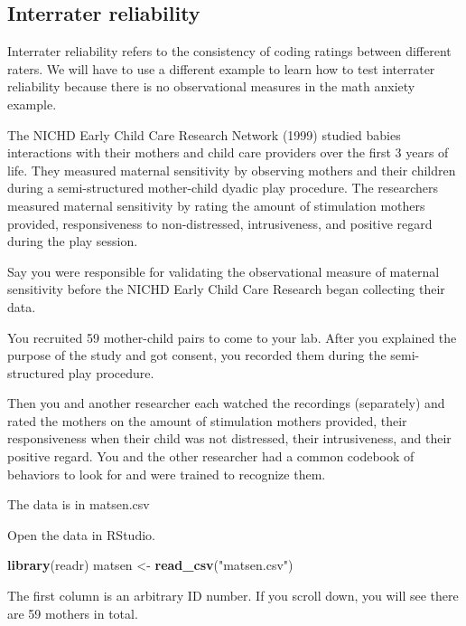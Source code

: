 \documentclass[
]{book}
\newenvironment{Shaded}{\begin{snugshade}}{\end{snugshade}}
\newcommand{\KeywordTok}[1]{\textcolor[rgb]{0.13,0.29,0.53}{\textbf{#1}}}
\newcommand{\NormalTok}[1]{#1}
\newcommand{\StringTok}[1]{\textcolor[rgb]{0.31,0.60,0.02}{#1}}
\begin{document}
\hypertarget{interrater-reliability}{%
\subsection{Interrater reliability}\label{interrater-reliability}}

Interrater reliability refers to the consistency of coding ratings between different raters. We will have to use a different example to learn how to test interrater reliability because there is no observational measures in the math anxiety example.

The NICHD Early Child Care Research Network (1999) studied babies interactions with their mothers and child care providers over the first 3 years of life. They measured maternal sensitivity by observing mothers and their children during a semi-structured mother-child dyadic play procedure. The researchers measured maternal sensitivity by rating the amount of stimulation mothers provided, responsiveness to non-distressed, intrusiveness, and positive regard during the play session.

Say you were responsible for validating the observational measure of maternal sensitivity before the NICHD Early Child Care Research began collecting their data.

You recruited 59 mother-child pairs to come to your lab. After you explained the purpose of the study and got consent, you recorded them during the semi-structured play procedure.

Then you and another researcher each watched the recordings (separately) and rated the mothers on the amount of stimulation mothers provided, their responsiveness when their child was not distressed, their intrusiveness, and their positive regard. You and the other researcher had a common codebook of behaviors to look for and were trained to recognize them.

The data is in matsen.csv

Open the data in RStudio.

\begin{Shaded}
\begin{Highlighting}[]
\KeywordTok{library}\NormalTok{(readr)}
\NormalTok{matsen <-}\StringTok{ }\KeywordTok{read_csv}\NormalTok{(}\StringTok{"matsen.csv"}\NormalTok{)}
\end{Highlighting}
\end{Shaded}

The first column is an arbitrary ID number. If you scroll down, you will see there are 59 mothers in total.
\end{document}
